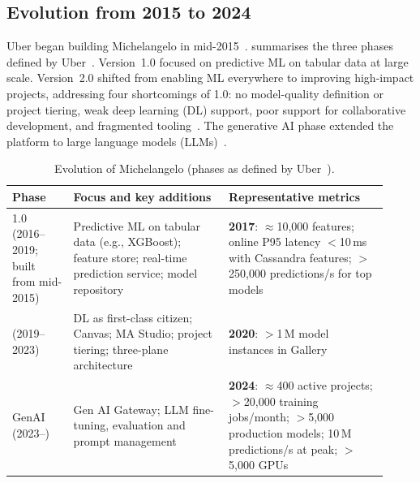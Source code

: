 \subsection{Evolution from 2015 to 2024}
\label{subsec:evolution}

Uber began building Michelangelo in mid-2015~\cite{delbalso2017meet}.
 summarises the three phases defined by
Uber~\cite{wang2024predictive}. Version~1.0 focused on predictive ML on
tabular data at large scale. Version~2.0 shifted from enabling ML
everywhere to improving high-impact projects, addressing four
shortcomings of 1.0: no model-quality definition or project tiering,
weak deep learning (DL) support, poor support for collaborative
development, and fragmented tooling~\cite{wang2024predictive}. The
generative AI phase extended the platform to large language models
(LLMs)~\cite{wang2024predictive}.

\begin{table}[t]
  \centering
  \caption{Evolution of Michelangelo (phases as defined by Uber~\cite{wang2024predictive}).}
  \label{tab:timeline}
  \small
  \begin{tabular}{@{}p{0.15\linewidth}p{0.38\linewidth}p{0.39\linewidth}@{}}
    \toprule
    \textbf{Phase} & \textbf{Focus and key additions} & \textbf{Representative metrics} \\
    \midrule
    1.0 \newline (2016--2019; built from mid-2015) &
      Predictive ML on tabular data (e.g., XGBoost); feature store;
      real-time prediction service; model
      repository~\cite{delbalso2017meet,wang2024predictive} &
      \textbf{2017}: $\approx$10{,}000 features; online P95 latency $<$10\,ms with Cassandra features;
      $>$250{,}000 predictions/s for top models~\cite{delbalso2017meet} \\
    \addlinespace
    2.0 \newline (2019--2023) &
      DL as first-class citizen; Canvas; MA Studio; project tiering;
      three-plane architecture~\cite{wang2024predictive} &
      \textbf{2020}: $>$1\,M model instances in Gallery~\cite{sun2020gallery} \\
    \addlinespace
    GenAI \newline (2023--) &
      Gen AI Gateway; LLM fine-tuning, evaluation and prompt
      management~\cite{wang2024predictive} &
      \textbf{2024}: $\approx$400 active projects; $>$20{,}000 training jobs/month;
      $>$5{,}000 production models; 10\,M predictions/s at
      peak; $>$5{,}000 GPUs~\cite{wang2024predictive} \\
    \bottomrule
  \end{tabular}
\end{table}

